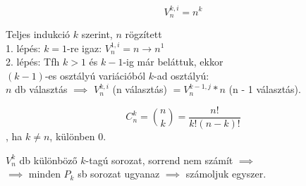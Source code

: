 \begin{frame}
\begin{tcolorbox}[title={Def.: Ismétléses Variáció}]
\end{tcolorbox}

\begin{tcolorbox}[title={Tétel: Ismétléses variációk száma}]
$$V_n^{k, i} = n^k$$
\end{tcolorbox}

\begin{tcolorbox}[title={Bizonyítás}]
Teljes indukció $k$ szerint, $n$ rögzített\\
1. lépés: $k = 1$-re igaz: $V_n^{1, i} = n \rightarrow n^1$\\
2. lépés: Tfh $k > 1$ és $k - 1$-ig már beláttuk, ekkor\\
$(k - 1)$-es osztályú variációból $k$-ad osztályú:\\
$n$ db választás $\implies$ $V_n^{k, i}$ (n választás) $= V_n^{k - 1, j} * n$ (n - 1 választás).
\end{tcolorbox}
\end{frame}

\begin{frame}
\begin{tcolorbox}[title={Def.: Ismétlés nélküli Kombináció}]
\end{tcolorbox}

\begin{tcolorbox}[title={Tétel: Kombinációk száma}]
$$C_n^k = {{n}\choose{k}} = \frac{n!}{k!(n - k)!} $$, ha $k \neq n$, különben 0.
\end{tcolorbox}

\begin{tcolorbox}[title={Bizonyítás}]
$V_n^k$ db különböző $k$-tagú sorozat, sorrend nem számít $\implies$\\
$\implies$ minden $P_k$ sb sorozat ugyanaz $\implies$ számoljuk egyszer.\\
\end{tcolorbox}
\end{frame}

